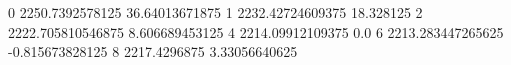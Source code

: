 0 2250.7392578125 36.64013671875
1 2232.42724609375 18.328125
2 2222.705810546875 8.606689453125
4 2214.09912109375 0.0
6 2213.283447265625 -0.815673828125
8 2217.4296875 3.33056640625
